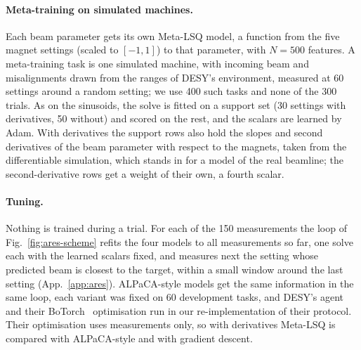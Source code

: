 \documentclass[fullpaper,final]{nldl}
\theoremstyle{plain}
\theoremstyle{definition}
\begin{document}
\paragraph{Meta-training on simulated machines.} Each beam parameter gets its own
Meta-LSQ model, a function from the five magnet settings (scaled to $[-1,1]$) to that
parameter, with $N{=}500$ features. A meta-training task is one simulated machine,
with incoming beam and misalignments drawn from the ranges of DESY's environment,
measured at 60 settings around a random setting; we use 400 such tasks and none of
the 300 trials. As on the sinusoids, the solve is fitted on a support set (30
settings with derivatives, 50 without) and scored on the rest, and the scalars are
learned by Adam. With derivatives the support rows also hold the slopes and second
derivatives of the beam parameter with respect to the magnets, taken from the
differentiable simulation, which stands in for a model of the real beamline; the
second-derivative rows get a weight of their own, a fourth scalar.

\paragraph{Tuning.} Nothing is trained during a trial. For each of the 150
measurements the loop of Fig.~\ref{fig:ares-scheme} refits the four models to all
measurements so far, one solve each with the learned scalars fixed, and measures
next the setting whose predicted beam is closest to the target, within a small
window around the last setting (App.~\ref{app:ares}). ALPaCA-style models get the
same information in the same loop, each variant was fixed on 60 development tasks,
and DESY's agent and their BoTorch~\citep{balandat2020botorch} optimisation run in
our re-implementation of their protocol. Their optimisation uses measurements only,
so with derivatives Meta-LSQ is compared with ALPaCA-style and with gradient descent.
\end{document}
